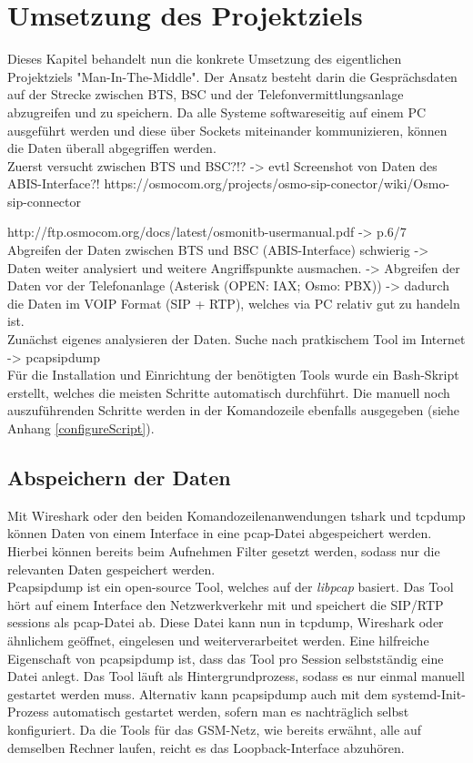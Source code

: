 \section{Umsetzung des Projektziels}\label{umsetzungProjekt}
Dieses Kapitel behandelt nun die konkrete Umsetzung des eigentlichen Projektziels "Man-In-The-Middle". Der Ansatz besteht darin die Gesprächsdaten auf der Strecke zwischen BTS, BSC und der Telefonvermittlungsanlage abzugreifen und zu speichern. Da alle Systeme softwareseitig auf einem PC ausgeführt werden und diese über Sockets miteinander kommunizieren, können die Daten überall abgegriffen werden.\\

Zuerst versucht zwischen BTS und BSC?!?
-> evtl Screenshot von Daten des ABIS-Interface?!
https://osmocom.org/projects/osmo-sip-conector/wiki/Osmo-sip-connector

http://ftp.osmocom.org/docs/latest/osmonitb-usermanual.pdf -> p.6/7 \\

Abgreifen der Daten zwischen BTS und BSC (ABIS-Interface) schwierig -> Daten weiter analysiert und weitere Angriffspunkte ausmachen.
-> Abgreifen der Daten vor der Telefonanlage (Asterisk (OPEN: IAX; Osmo: PBX)) -> dadurch die Daten im VOIP Format (SIP + RTP), welches via PC relativ gut zu handeln ist. \\

Zunächst eigenes analysieren der Daten. Suche nach pratkischem Tool im Internet
-> pcapsipdump\\


Für die Installation und Einrichtung der benötigten Tools wurde ein Bash-Skript erstellt, welches die meisten Schritte automatisch durchführt. Die manuell noch auszuführenden Schritte werden in der Komandozeile ebenfalls ausgegeben (siehe Anhang \ref{configureScript}).


\subsection{Abspeichern der Daten}\label{abspeichern}
Mit Wireshark oder den beiden Komandozeilenanwendungen tshark und tcpdump können Daten von einem Interface in eine pcap-Datei abgespeichert werden. Hierbei können bereits beim Aufnehmen Filter gesetzt werden, sodass nur die relevanten Daten gespeichert werden.\\

Pcapsipdump ist ein open-source Tool, welches auf der \textit{libpcap} basiert. Das Tool hört auf einem Interface den Netzwerkverkehr mit und speichert die SIP/RTP sessions als pcap-Datei ab. Diese Datei kann nun in tcpdump, Wireshark oder ähnlichem geöffnet, eingelesen und weiterverarbeitet werden. Eine hilfreiche Eigenschaft von pcapsipdump ist, dass das Tool pro Session selbstständig eine Datei anlegt. Das Tool läuft als Hintergrundprozess, sodass es nur einmal manuell gestartet werden muss. Alternativ kann pcapsipdump auch mit dem systemd-Init-Prozess automatisch gestartet werden, sofern man es nachträglich selbst konfiguriert. Da die Tools für das GSM-Netz, wie bereits erwähnt, alle auf demselben Rechner laufen, reicht es das Loopback-Interface abzuhören.\\

